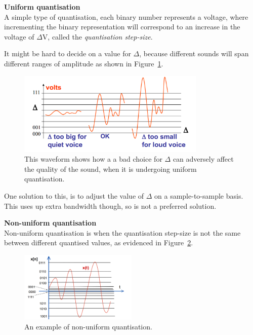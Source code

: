 \begin{description}
  \item \textbf{Uniform quantisation}\\
  \label{uniform-quantisation}
  A simple type of quantisation, each binary number represents a voltage, where 
  incrementing the binary representation will correspond to an increase in the 
  voltage of $\Delta\si{\volt}$, called the \textit{quantisation step-size}.

  It might be hard to decide on a value for $\Delta$, because different sounds
  will span different ranges of amplitude as shown in Figure~\ref{choosing-delta}.

  \begin{figure}
    \centering
    \includegraphics[width=0.8\textwidth]{images/choosing-delta}
    \caption{This waveform shows how a a bad choice for $\Delta$ can adversely
    affect the quality of the sound, when it is undergoing uniform quantisation.}
    \label{choosing-delta}
  \end{figure}

  One solution to this, is to adjust the value of $\Delta$ on a sample-to-sample
  basis. This uses up extra bandwidth though, so is not a preferred solution.

  \item \textbf{Non-uniform quantisation}\\
  \label{non-uniform-quantisation}
  Non-uniform quantisation is when the quantisation step-size is not the same
  between different quantised values, as evidenced in
  Figure~\ref{fig-non-uniform-quantisation}.


  \begin{figure}
    \centering
    \includegraphics[width=0.5\textwidth]{images/non-uniform-quantisation}
    \caption{An example of non-uniform quantisation.}
    \label{fig-non-uniform-quantisation}
  \end{figure}


\end{description}
